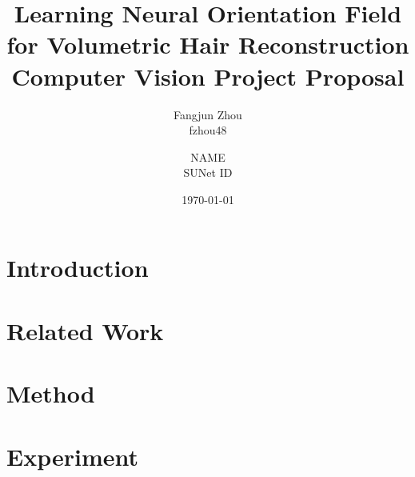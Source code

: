 \documentclass[12pt]{article}
\title{
  Learning Neural Orientation Field for Volumetric Hair Reconstruction \\
  {
    \small
    Computer Vision Project Proposal
  }
}
\author{
  Fangjun Zhou \\ fzhou48
  \and NAME \\ SUNet ID
}
\date{\today}
\begin{document}
  \maketitle

  \section{Introduction}

  \section{Related Work}

  \section{Method}

  \section{Experiment}
\end{document}
